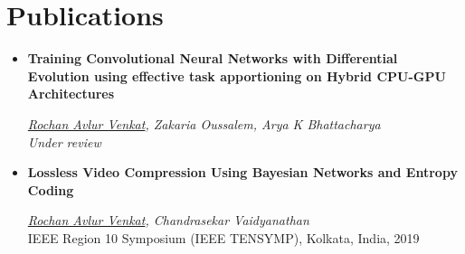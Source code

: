 \documentclass[a4paper,11pt]{article}
\newcommand{\resumeSubHeadingListStart}{\begin{itemize}[leftmargin=*]}
\newcommand{\resumeSubHeadingListEnd}{\end{itemize}}
\begin{document}
\section{Publications}
    \resumeSubHeadingListStart
        \item[] \textbf{Training Convolutional Neural Networks with Differential Evolution using effective task apportioning on Hybrid CPU-GPU Architectures}
        \vspace*{-3pt}\begin{adjustwidth}{13pt}{}
            \textit{\underline{Rochan Avlur Venkat}, Zakaria Oussalem, Arya K Bhattacharya} \\ \textit{Under review}
        \end{adjustwidth}

        \item[] \textbf{Lossless Video Compression Using Bayesian Networks and Entropy Coding}
        \vspace*{-3pt}\begin{adjustwidth}{13pt}{}
            \textit{\underline{Rochan Avlur Venkat}, Chandrasekar Vaidyanathan} \\
            IEEE Region 10 Symposium (IEEE TENSYMP), Kolkata, India, 2019
        \end{adjustwidth}
    \resumeSubHeadingListEnd


\end{document}
